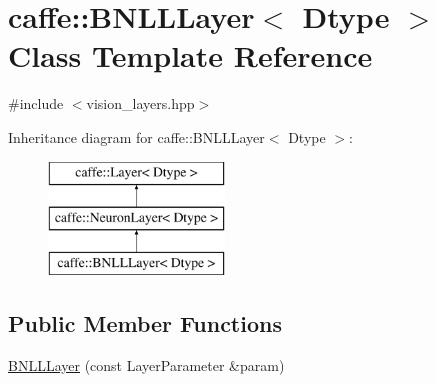 \hypertarget{classcaffe_1_1_b_n_l_l_layer}{\section{caffe\+:\+:B\+N\+L\+L\+Layer$<$ Dtype $>$ Class Template Reference}
\label{classcaffe_1_1_b_n_l_l_layer}
}


{\ttfamily \#include $<$vision\+\_\+layers.\+hpp$>$}

Inheritance diagram for caffe\+:\+:B\+N\+L\+L\+Layer$<$ Dtype $>$\+:\begin{figure}[H]
\begin{center}
\leavevmode
\includegraphics[height=3.000000cm]{classcaffe_1_1_b_n_l_l_layer}
\end{center}
\end{figure}
\subsection*{Public Member Functions}
\begin{DoxyCompactItemize}
\item 
\hyperlink{classcaffe_1_1_b_n_l_l_layer_ab30d4b1d22f7489597449e09d74cf4b9}{B\+N\+L\+L\+Layer} (const Layer\+Parameter \&param)
\end{DoxyCompactItemize}
